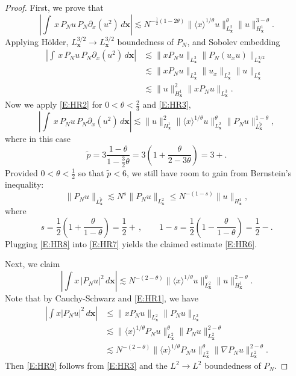 \documentclass[12pt,letterpaper]{amsart}
\newcommand{\la}{\langle}
\newcommand{\ra}{\rangle}
\theoremstyle{remark}
\numberwithin{equation}{section}
\numberwithin{theorem}{section}
\numberwithin{table}{section}
\begin{document}
\begin{proof}
First, we prove that
\begin{equation}
\label{E:HR6}
\left|\int \, x \, P_N u \, P_N\partial_x (u^2) \, d\mathbf{x}\right| \lesssim N^{-\frac12(1 - 2\theta)}\| \la x\ra^{1/\theta} u \|_{L_{\mathbf{x}}^2}^\theta \| u \|_{H_{\mathbf{x}}^1}^{3-\theta}. 
\end{equation}
Applying H\"older, $L_{\mathbf{x}}^{3/2} \to L_{\mathbf{x}}^{3/2}$ boundedness of $P_N$, and Sobolev embedding
\begin{align*}
\left|\int \, x \, P_N u \, P_N\partial_x (u^2) \, d\mathbf{x}\right| &\lesssim \|xP_N u \|_{L_{\mathbf{x}}^3} \|P_N(  u_x u) \|_{L_{\mathbf{x}}^{3/2}} \\
&\lesssim \|xP_N u \|_{L_{\mathbf{x}}^3} \|u_x \|_{L_{\mathbf{x}}^2} \|u\|_{L_{\mathbf{x}}^6} \\
&\lesssim \| u \|_{H_{\mathbf{x}}^1}^2 \|xP_Nu \|_{L_{\mathbf{x}}^3}.
\end{align*}
Now we apply \eqref{E:HR2} for $0<\theta<\frac23$ and \eqref{E:HR3},
\begin{equation}
\label{E:HR7}
\left|\int \, x \, P_N u \, P_N\partial_x (u^2) \, d\mathbf{x}\right| \lesssim \| u \|_{H_{\mathbf{x}}^1}^2 \| \la x\ra^{1/\theta} u \|_{L_{\mathbf{x}}^2}^\theta \|P_N u \|_{L_{\mathbf{x}}^{\tilde p}}^{1-\theta},
\end{equation}
where in this case
$$
\tilde p = 3 \frac{1-\theta}{1-\frac32\theta}= 3(1+ \frac{\theta}{2-3\theta})=3+.
$$
Provided $0<\theta< \frac12$ so that $\tilde p <6$, we still have room to gain from Bernstein's inequality:  
\begin{equation}
\label{E:HR8}
\|P_N u \|_{L_{\mathbf{x}}^{\tilde p}} \lesssim N^s \|P_N u\|_{L_{\mathbf{x}}^2} \leq N^{-(1-s)}\|u\|_{H_{\mathbf{x}}^1},
\end{equation}
where
$$
s = \frac12(1+ \frac{\theta}{1-\theta})=\frac12+\,, \qquad 1-s = \frac12( 1- \frac{\theta}{1-\theta})=\frac12-.
$$
Plugging \eqref{E:HR8} into \eqref{E:HR7} yields the claimed estimate \eqref{E:HR6}.  

Next, we claim
\begin{equation}
\label{E:HR9}
\left| \int x\, |P_Nu|^2 \, d\mathbf{x} \right| \lesssim N^{-(2-\theta)} \|\la x \ra^{1/\theta}  u \|_{L_{\mathbf{x}}^2}^\theta \| u \|_{H_{\mathbf{x}}^1}^{2-\theta}.
\end{equation}
Note that by Cauchy-Schwarz and \eqref{E:HR1}, we have
\begin{align*}
\left| \int x |P_Nu|^2 \, d\mathbf{x} \right|&\leq \| x P_Nu \|_{L_{\mathbf{x}}^2} \|P_N u \|_{L_{\mathbf{x}}^2} \\
&\lesssim \|\la x \ra^{1/\theta} P_N u \|_{L_{\mathbf{x}}^2}^\theta \|P_N u \|_{L_{\mathbf{x}}^2}^{2-\theta} \\
&\lesssim N^{-(2-\theta)} \|\la x \ra^{1/\theta} P_N u \|_{L_{\mathbf{x}}^2}^\theta \|\nabla P_N u \|_{L_{\mathbf{x}}^2}^{2-\theta}.
\end{align*}
Then \eqref{E:HR9} follows from \eqref{E:HR3} and the $L^2\to L^2$ boundedness of $P_N$.


\end{proof}
\end{document}
